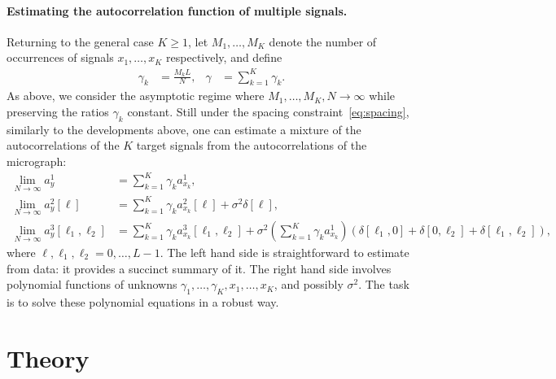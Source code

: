 \documentclass[english,11pt]{article}
\newcommand{\1}{\mathbf{1}}
\numberwithin{equation}{section}
\theoremstyle{plain}
\theoremstyle{definition}
\theoremstyle{remark}
\theoremstyle{plain}
\theoremstyle{remark}
\theoremstyle{plain}
\theoremstyle{plain}
\begin{document}
\paragraph{Estimating the autocorrelation function of multiple signals.}

Returning to the general case $K \geq 1$, let $M_1, \ldots, M_K$ denote the number of occurrences of signals $x_1, \ldots, x_K$ respectively, and define
\begin{align}
\gamma_k & = \frac{M_k L}{N}, & \gamma & = \sum_{k=1}^K\gamma_k.
\end{align}
As above, we consider the asymptotic regime where $M_1,\ldots,M_K,N\to\infty$ while preserving the ratios $\gamma_k$ constant.
% 
Still under the spacing constraint~\eqref{eq:spacing}, similarly to the developments above, one can estimate a mixture of the autocorrelations of the $K$ target signals from the autocorrelations of the micrograph:
\begin{align}
\lim_{N\to\infty} a_y^1 & = \sum_{k=1}^K\gamma_k a_{x_k}^1, \nonumber\\
\lim_{N\to\infty} a_y^2[\ell] & = \sum_{k=1}^K\gamma_k a_{x_k}^2[\ell] +\sigma^2\delta[\ell],  \label{eq:data_ac}\\
\lim_{N\to\infty} a_y^3[\ell_1,\ell_2] & = \sum_{k=1}^K\gamma_k a_{x_k}^3[\ell_1,\ell_2] + \sigma^2\left(\sum_{k=1}^K\gamma_k a_{x_k}^1\right)(\delta[\ell_1,0]+\delta[0,\ell_2]+\delta[\ell_1,\ell_2]), \nonumber
\end{align}
where $\ell, \ell_1, \ell_2 = 0, \ldots, L-1$. The left hand side is straightforward to estimate from data: it provides a succinct summary of it. The right hand side involves polynomial functions of unknowns $\gamma_1, \ldots, \gamma_K, x_1, \ldots, x_K$, and possibly $\sigma^2$. The task is to solve these polynomial equations in a robust way.





\section{Theory} \label{sec:theory}
\end{document}
